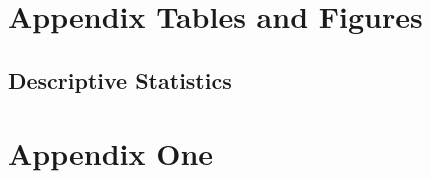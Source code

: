 \documentclass[12pt]{article}
\begin{document}
\clearpage
\begin{singlespace}
%
%


\end{singlespace}


\newpage
\appendix
\setcounter{table}{0}
\renewcommand{\tablename}{Appendix Table}
\renewcommand{\figurename}{Appendix Figure}
\renewcommand{\thetable}{A\arabic{table}}
\setcounter{figure}{0}
\renewcommand{\thefigure}{A\arabic{figure}}

\section{Appendix Tables and Figures}
\subsection{Descriptive Statistics}


\label{tab:1}
\newpage


\newpage 
\section{Appendix One \label{sec:appendix:first}}
\renewcommand{\thetable}{B\arabic{table}}
\setcounter{table}{0}
\renewcommand{\thefigure}{B\arabic{figure}}
\setcounter{figure}{0}
\end{document}
